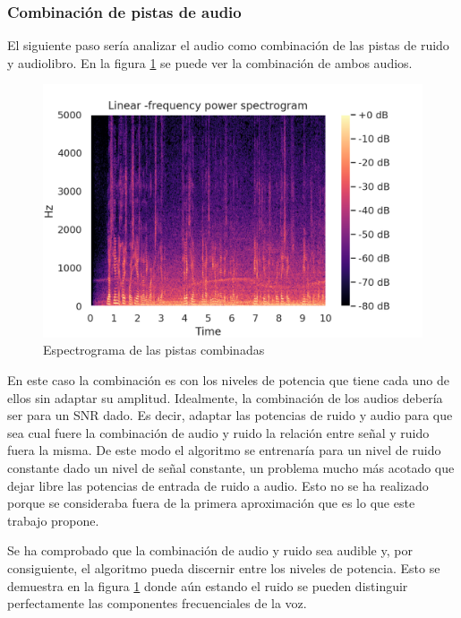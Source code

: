 \subsubsection{Combinación de pistas de audio}
El siguiente paso sería analizar el audio como combinación de las pistas de ruido y audiolibro. En la figura \ref{fig: combination_spectral} se puede ver la combinación de ambos audios.

\begin{figure}[h!]
	\centering
	\includegraphics[width=0.9\columnwidth]{figures/combination_spectrogram.png}
	\caption{Espectrograma de las pistas combinadas}
	\label{fig: combination_spectral}
\end{figure}

En este caso la combinación es con los niveles de potencia que tiene cada uno de ellos sin adaptar su amplitud. Idealmente, la combinación de los audios debería ser para un \gls{SNR} dado. Es decir, adaptar las potencias de ruido y audio para que sea cual fuere la combinación de audio y ruido la relación entre señal y ruido fuera la misma. De este modo el algoritmo se entrenaría para un nivel de ruido constante dado un nivel de señal constante, un problema mucho más acotado que dejar libre las potencias de entrada de ruido a audio. Esto no se ha realizado porque se consideraba fuera de la primera aproximación que es lo que este trabajo propone.

Se ha comprobado que la combinación de audio y ruido sea audible y, por consiguiente, el algoritmo pueda discernir entre los niveles de potencia. Esto se demuestra en la figura \ref{fig: combination_spectral} donde aún estando el ruido se pueden distinguir perfectamente las componentes frecuenciales de la voz.

